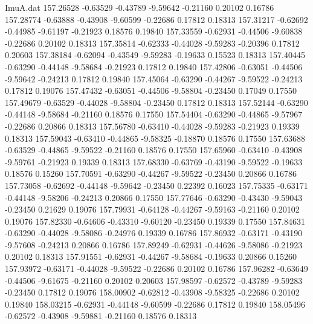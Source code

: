 \begin{filecontents}{ImuA.dat}
 157.26528   -0.63529   -0.43789   -9.59642   -0.21160    0.20102    0.16786
 157.28774   -0.63888   -0.43908   -9.60599   -0.22686    0.17812    0.18313
 157.31217   -0.62692   -0.44985   -9.61197   -0.21923    0.18576    0.19840
 157.33559   -0.62931   -0.44506   -9.60838   -0.22686    0.20102    0.18313
 157.35814   -0.62333   -0.44028   -9.59283   -0.20396    0.17812    0.20603
 157.38184   -0.62094   -0.43549   -9.59283   -0.19633    0.15523    0.18313
 157.40445   -0.63290   -0.44148   -9.58684   -0.21923    0.17812    0.19840
 157.42806   -0.63051   -0.44506   -9.59642   -0.24213    0.17812    0.19840
 157.45064   -0.63290   -0.44267   -9.59522   -0.24213    0.17812    0.19076
 157.47432   -0.63051   -0.44506   -9.58804   -0.23450    0.17049    0.17550
 157.49679   -0.63529   -0.44028   -9.58804   -0.23450    0.17812    0.18313
 157.52144   -0.63290   -0.44148   -9.58684   -0.21160    0.18576    0.17550
 157.54404   -0.63290   -0.44865   -9.57967   -0.22686    0.20866    0.18313
 157.56780   -0.63410   -0.44028   -9.59283   -0.21923    0.19339    0.18313
 157.59043   -0.63410   -0.44865   -9.58325   -0.18870    0.18576    0.17550
 157.63688   -0.63529   -0.44865   -9.59522   -0.21160    0.18576    0.17550
 157.65960   -0.63410   -0.43908   -9.59761   -0.21923    0.19339    0.18313
 157.68330   -0.63769   -0.43190   -9.59522   -0.19633    0.18576    0.15260
 157.70591   -0.63290   -0.44267   -9.59522   -0.23450    0.20866    0.16786
 157.73058   -0.62692   -0.44148   -9.59642   -0.23450    0.22392    0.16023
 157.75335   -0.63171   -0.44148   -9.58206   -0.24213    0.20866    0.17550
 157.77646   -0.63290   -0.43430   -9.59043   -0.23450    0.21629    0.19076
 157.79931   -0.64128   -0.44267   -9.59163   -0.21160    0.20102    0.19076
 157.82330   -0.64606   -0.43310   -9.60120   -0.23450    0.19339    0.17550
 157.84631   -0.63290   -0.44028   -9.58086   -0.24976    0.19339    0.16786
 157.86932   -0.63171   -0.43190   -9.57608   -0.24213    0.20866    0.16786
 157.89249   -0.62931   -0.44626   -9.58086   -0.21923    0.20102    0.18313
 157.91551   -0.62931   -0.44267   -9.58684   -0.19633    0.20866    0.15260
 157.93972   -0.63171   -0.44028   -9.59522   -0.22686    0.20102    0.16786
 157.96282   -0.63649   -0.44506   -9.61675   -0.21160    0.20102    0.20603
 157.98597   -0.62572   -0.43789   -9.59283   -0.23450    0.17812    0.19076
 158.00902   -0.62812   -0.43908   -9.58325   -0.22686    0.20102    0.19840
 158.03215   -0.62931   -0.44148   -9.60599   -0.22686    0.17812    0.19840
 158.05496   -0.62572   -0.43908   -9.59881   -0.21160    0.18576    0.18313

\end{filecontents}
